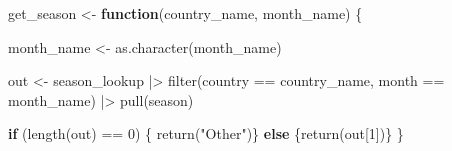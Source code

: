 \documentclass[
  letterpaper,
  DIV=11,
  numbers=noendperiod]{scrartcl}
\newenvironment{Shaded}{\begin{snugshade}}{\end{snugshade}}
\newcommand{\ControlFlowTok}[1]{\textcolor[rgb]{0.00,0.23,0.31}{\textbf{#1}}}
\newcommand{\DecValTok}[1]{\textcolor[rgb]{0.68,0.00,0.00}{#1}}
\newcommand{\FunctionTok}[1]{\textcolor[rgb]{0.28,0.35,0.67}{#1}}
\newcommand{\NormalTok}[1]{\textcolor[rgb]{0.00,0.23,0.31}{#1}}
\newcommand{\OtherTok}[1]{\textcolor[rgb]{0.00,0.23,0.31}{#1}}
\newcommand{\SpecialCharTok}[1]{\textcolor[rgb]{0.37,0.37,0.37}{#1}}
\newcommand{\StringTok}[1]{\textcolor[rgb]{0.13,0.47,0.30}{#1}}
\begin{document}
\begin{Shaded}
\begin{Highlighting}[]
\NormalTok{get\_season }\OtherTok{\textless{}{-}} \ControlFlowTok{function}\NormalTok{(country\_name, month\_name) \{}
  
\NormalTok{  month\_name }\OtherTok{\textless{}{-}} \FunctionTok{as.character}\NormalTok{(month\_name)}
  
\NormalTok{  out }\OtherTok{\textless{}{-}}\NormalTok{ season\_lookup }\SpecialCharTok{|\textgreater{}}
    \FunctionTok{filter}\NormalTok{(country }\SpecialCharTok{==}\NormalTok{ country\_name, month }\SpecialCharTok{==}\NormalTok{ month\_name) }\SpecialCharTok{|\textgreater{}}
    \FunctionTok{pull}\NormalTok{(season)}
  
  \ControlFlowTok{if}\NormalTok{ (}\FunctionTok{length}\NormalTok{(out) }\SpecialCharTok{==} \DecValTok{0}\NormalTok{) \{}
    \FunctionTok{return}\NormalTok{(}\StringTok{"Other"}\NormalTok{)\}}
  \ControlFlowTok{else}\NormalTok{ \{}\FunctionTok{return}\NormalTok{(out[}\DecValTok{1}\NormalTok{])\}}
\NormalTok{  \}}
\end{Highlighting}
\end{Shaded}
\end{document}

